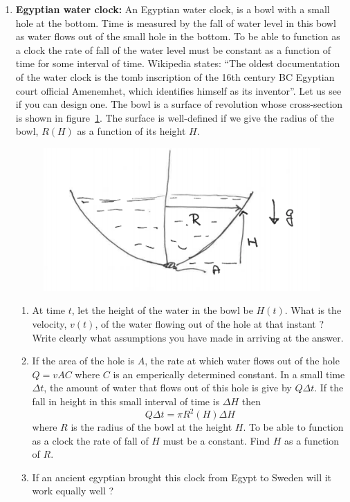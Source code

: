 \documentclass[12pt,a4paper]{article}
\begin{document}
\begin{enumerate}
\item {\bf Egyptian water clock:}
  An Egyptian water clock, is a bowl with a small hole at the
  bottom. Time is measured by the fall of water level in this bowl as
  water flows out of the small hole in the bottom. To be able to
  function as a clock the rate of fall of the water level must be
  constant as a function of time for some interval of time.
  Wikipedia states: ``The oldest documentation of the water clock is
  the tomb  inscription
  of the 16th century BC Egyptian court official Amenemhet,
  which identifies himself as its inventor''. Let us see if you can
  design one.   The bowl is a surface of revolution whose
  cross-section is shown in figure~\ref{fig:clock}.
  The surface is well-defined if we give the radius of the bowl, $R(H)$
  as a function of its height $H$.
  \begin{figure}[h]
    \includegraphics[width=0.5\linewidth]{egypt.png}
    \label{fig:clock}
   \end{figure}
  \begin{enumerate}
\item At time $t$, let the height of the water in the bowl be
  $H(t)$. What is the velocity, $v(t)$, of the water flowing out of the hole at
  that instant ?  Write clearly what assumptions you have made in
  arriving at the answer.
  \item If the area of the hole is $A$, the rate at which water flows
    out of the hole $Q = v A C $ where $C$ is an emperically
    determined constant. In a small time $\Delta t$, the amount of
    water that flows out of this hole is give by $Q\Delta t$. If the
    fall in height in this small interval of time is $\Delta H$ then
    \begin{equation}
      Q\Delta t = \pi R^2(H)\Delta H
      \end{equation}
    where $R$ is the radius of the bowl at the height $H$. To be able
    to function as a clock the rate of fall of $H$ must be a
    constant. Find $H$ as a function of $R$.
  \item If an ancient egyptian brought this clock from Egypt to Sweden
    will it work equally well ? 
  \end{enumerate}


\end{enumerate}
\end{document}
